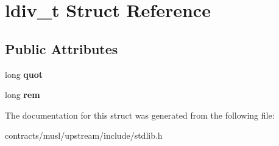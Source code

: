 \hypertarget{structldiv__t}{}\section{ldiv\+\_\+t Struct Reference}
\label{structldiv__t}
\subsection*{Public Attributes}
\begin{DoxyCompactItemize}
\item 
\mbox{\label{structldiv__t_a73efd59c176304c327cb4214d0e5e5c9}} 
long {\bfseries quot}
\item 
\mbox{\label{structldiv__t_a0f217ff62b8640aa945ec84d6d0bd000}} 
long {\bfseries rem}
\end{DoxyCompactItemize}


The documentation for this struct was generated from the following file\+:\begin{DoxyCompactItemize}
\item 
contracts/musl/upstream/include/stdlib.\+h\end{DoxyCompactItemize}
